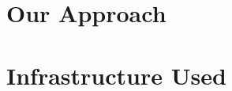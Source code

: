 \documentclass[DIV=calc, paper=a4, fontsize=10pt, twocolumn]{scrartcl}	 %
\begin{document}
\section{Our Approach}



\section{Infrastructure Used}





\end{document}
